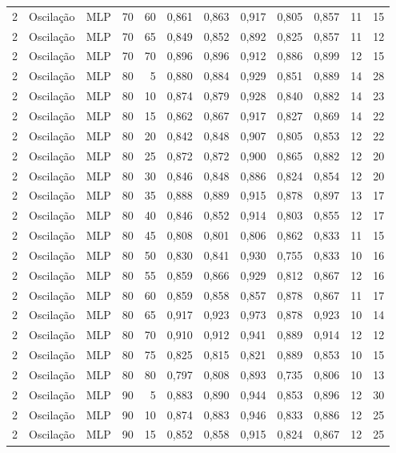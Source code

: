 \begin{longtable}{@{}rllrrrrrrrrr@{}}
2 & Oscilação & MLP & 70 & 60 & 0,861 & 0,863 & 0,917 & 0,805 & 0,857 & 11 & 15 \\
2 & Oscilação & MLP & 70 & 65 & 0,849 & 0,852 & 0,892 & 0,825 & 0,857 & 11 & 12 \\
2 & Oscilação & MLP & 70 & 70 & 0,896 & 0,896 & 0,912 & 0,886 & 0,899 & 12 & 15 \\
2 & Oscilação & MLP & 80 & 5 & 0,880 & 0,884 & 0,929 & 0,851 & 0,889 & 14 & 28 \\
2 & Oscilação & MLP & 80 & 10 & 0,874 & 0,879 & 0,928 & 0,840 & 0,882 & 14 & 23 \\
2 & Oscilação & MLP & 80 & 15 & 0,862 & 0,867 & 0,917 & 0,827 & 0,869 & 14 & 22 \\
2 & Oscilação & MLP & 80 & 20 & 0,842 & 0,848 & 0,907 & 0,805 & 0,853 & 12 & 22 \\
2 & Oscilação & MLP & 80 & 25 & 0,872 & 0,872 & 0,900 & 0,865 & 0,882 & 12 & 20 \\
2 & Oscilação & MLP & 80 & 30 & 0,846 & 0,848 & 0,886 & 0,824 & 0,854 & 12 & 20 \\
2 & Oscilação & MLP & 80 & 35 & 0,888 & 0,889 & 0,915 & 0,878 & 0,897 & 13 & 17 \\
2 & Oscilação & MLP & 80 & 40 & 0,846 & 0,852 & 0,914 & 0,803 & 0,855 & 12 & 17 \\
2 & Oscilação & MLP & 80 & 45 & 0,808 & 0,801 & 0,806 & 0,862 & 0,833 & 11 & 15 \\
2 & Oscilação & MLP & 80 & 50 & 0,830 & 0,841 & 0,930 & 0,755 & 0,833 & 10 & 16 \\
2 & Oscilação & MLP & 80 & 55 & 0,859 & 0,866 & 0,929 & 0,812 & 0,867 & 12 & 16 \\
2 & Oscilação & MLP & 80 & 60 & 0,859 & 0,858 & 0,857 & 0,878 & 0,867 & 11 & 17 \\
2 & Oscilação & MLP & 80 & 65 & 0,917 & 0,923 & 0,973 & 0,878 & 0,923 & 10 & 14 \\
2 & Oscilação & MLP & 80 & 70 & 0,910 & 0,912 & 0,941 & 0,889 & 0,914 & 12 & 12 \\
2 & Oscilação & MLP & 80 & 75 & 0,825 & 0,815 & 0,821 & 0,889 & 0,853 & 10 & 15 \\
2 & Oscilação & MLP & 80 & 80 & 0,797 & 0,808 & 0,893 & 0,735 & 0,806 & 10 & 13 \\
2 & Oscilação & MLP & 90 & 5 & 0,883 & 0,890 & 0,944 & 0,853 & 0,896 & 12 & 30 \\
2 & Oscilação & MLP & 90 & 10 & 0,874 & 0,883 & 0,946 & 0,833 & 0,886 & 12 & 25 \\
2 & Oscilação & MLP & 90 & 15 & 0,852 & 0,858 & 0,915 & 0,824 & 0,867 & 12 & 25 \\

\end{longtable}
